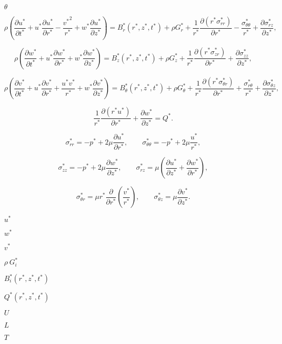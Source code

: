 \documentclass{article}
\begin{document}
$ \theta $
\pagebreak

\[ \rho\left(\frac{\partial u^*}{\partial t^*} + {u^*}\frac{\partial u^*}{\partial r^*} - \frac{{v^*}^2}{r^*} + {w^*}\frac{\partial u^*}{\partial z^*} \right) = B_r^*\left(r^*,z^*,t^*\right)+ \rho G_r^*+ \frac{1}{r^*} \frac{\partial\left({r^*}\sigma_{rr}^*\right)}{\partial r^*} - \frac{\sigma_{\theta\theta}^*}{r^*} + \frac{\partial\sigma_{rz}^*}{\partial z^*}, \]
\pagebreak

\[ \rho\left(\frac{\partial w^*}{\partial t^*} + {u^*}\frac{\partial w^*}{\partial r^*} + {w^*}\frac{\partial w^*}{\partial z^*} \right) = B_z^*\left(r^*,z^*,t^*\right)+\rho G_z^*+ \frac{1}{r^*}\frac{\partial\left({r^*}\sigma_{zr}^*\right)}{\partial r^*} + \frac{\partial\sigma_{zz}^*}{\partial z^*}, \]
\pagebreak

\[ \rho\left(\frac{\partial v^*}{\partial t^*} + {u^*}\frac{\partial v^*}{\partial r^*} + \frac{u^* v^*}{r^*} +{w^*}\frac{\partial v^*}{\partial z^*} \right)= B_\theta^*\left(r^*,z^*,t^*\right)+ \rho G_\theta^*+ \frac{1}{r^*}\frac{\partial\left({r^*}\sigma_{\theta r}^*\right)}{\partial r^*} + \frac{\sigma_{r\theta}^*}{r^*} + \frac{\partial\sigma_{\theta z}^*}{\partial z^*}, \]
\pagebreak

\[ \frac{1}{r^*}\frac{\partial\left(r^*u^*\right)}{\partial r^*} + \frac{\partial w^*}{\partial z^*} = Q^*. \]
\pagebreak

\[ \sigma_{rr}^* = -p^* + 2\mu\frac{\partial u^*}{\partial r^*}, \qquad \sigma_{\theta\theta}^* = -p^* +2\mu\frac{u^*}{r^*}, \]
\pagebreak

\[ \sigma_{zz}^* = -p^* + 2\mu\frac{\partial w^*}{\partial z^*}, \qquad \sigma_{rz}^* = \mu\left(\frac{\partial u^*}{\partial z^*} + \frac{\partial w^*}{\partial r^*}\right), \]
\pagebreak

\[ \sigma_{\theta r}^* = \mu r^*\frac{\partial}{\partial r^*} \left(\frac{v^*}{r^*}\right), \qquad \sigma_{\theta z}^* = \mu\frac{\partial v^*}{\partial z^*}. \]
\pagebreak

$ u^* $
\pagebreak

$ w^* $
\pagebreak

$ v^* $
\pagebreak

$ \rho \ G_i^* $
\pagebreak

$ B_i^*(r^*,z^*,t^*) $
\pagebreak

$ Q^*(r^*,z^*,t^*) $
\pagebreak

$ U $
\pagebreak

$ L $
\pagebreak

$ T $
\pagebreak
\end{document}
